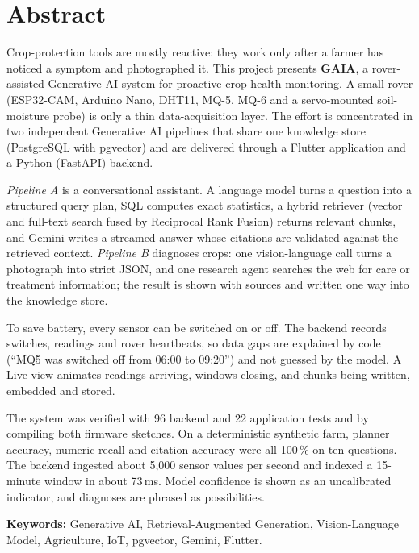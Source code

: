 \chapter*{Abstract}

Crop-protection tools are mostly reactive: they work only after a farmer has noticed a symptom and photographed it. This
project presents \textbf{GAIA}, a rover-assisted Generative AI system for proactive crop health monitoring. A small rover
(ESP32-CAM, Arduino Nano, DHT11, MQ-5, MQ-6 and a servo-mounted soil-moisture probe) is only a thin data-acquisition layer. The
effort is concentrated in two independent Generative AI pipelines that share one knowledge store (PostgreSQL with pgvector)
and are delivered through a Flutter application and a Python (FastAPI) backend.

\emph{Pipeline A} is a conversational assistant. A language model turns a question into a structured query plan, SQL computes exact
statistics, a hybrid retriever (vector and full-text search fused by Reciprocal Rank Fusion) returns relevant chunks, and Gemini
writes a streamed answer whose citations are validated against the retrieved context. \emph{Pipeline B} diagnoses crops: one
vision-language call turns a photograph into strict JSON, and one research agent searches the web for care or treatment
information; the result is shown with sources and written one way into the knowledge store.

To save battery, every sensor can be switched on or off. The backend records switches, readings and rover heartbeats, so data gaps
are explained by code (``MQ5 was switched off from 06:00 to 09:20'') and not guessed by the model. A Live view animates readings arriving,
windows closing, and chunks being written, embedded and stored.

The system was verified with 96 backend and 22 application tests and by compiling both firmware sketches. On a deterministic
synthetic farm, planner accuracy, numeric recall and citation accuracy were all 100\,\% on ten questions. The backend ingested about
5,000 sensor values per second and indexed a 15-minute window in about 73\,ms. Model confidence is shown as an uncalibrated
indicator, and diagnoses are phrased as possibilities.

\noindent\textbf{Keywords:} Generative AI, Retrieval-Augmented Generation, Vision-Language Model, Agriculture, IoT, pgvector, Gemini, Flutter.
\clearpage

